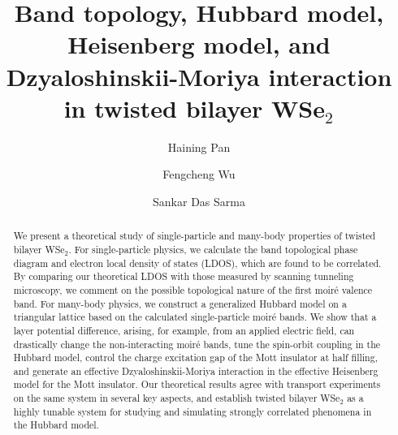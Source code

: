\documentclass[aps,prx,floatfix,twocolumn]{revtex4-1}
\begin{document}
	\title{Band topology, Hubbard model, Heisenberg model, and Dzyaloshinskii-Moriya interaction in twisted bilayer WSe$_2$}
	
	
	\author{Haining Pan}
	\author{Fengcheng Wu}
	\author{Sankar Das Sarma}
	
	
	\begin{abstract}
	We present a theoretical study of single-particle and many-body properties of twisted bilayer WSe$_2$. For single-particle physics, we calculate the band topological phase diagram and electron local density of states (LDOS), which are found to be correlated. By comparing our theoretical LDOS with those measured by scanning tunneling microscopy, we comment on the possible topological nature of  the first moir\'e valence band. For many-body physics, we construct a generalized Hubbard model on a triangular lattice based on the calculated single-particle moir\'e bands. We show that a layer potential difference, arising, for example, from an applied electric field, can drastically change the non-interacting moir\'e bands, tune the spin-orbit coupling in the Hubbard model, control the charge excitation gap of the Mott insulator at half filling, and generate an effective Dzyaloshinskii-Moriya interaction in the effective Heisenberg model for the Mott insulator. Our theoretical results agree with transport experiments on the same system in several key aspects, and establish twisted bilayer WSe$_2$ as a highly tunable system for studying and simulating strongly correlated phenomena in the Hubbard model.    
	\end{abstract}
	
	
	\maketitle
	
	
\end{document}
